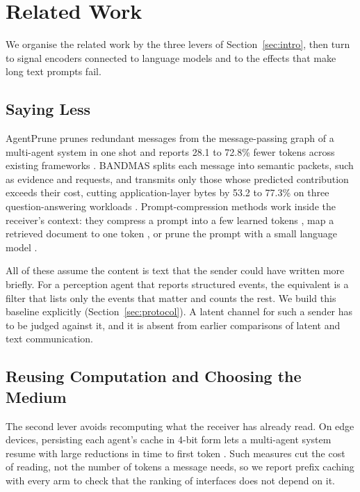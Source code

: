 \section{Related Work}
\label{sec:related}

We organise the related work by the three levers of Section~\ref{sec:intro}, then turn to signal encoders connected to language models and to the effects that make long text prompts fail.

\subsection{Saying Less}
AgentPrune prunes redundant messages from the message-passing graph of a multi-agent system in one shot and reports 28.1 to 72.8\% fewer tokens across existing frameworks \cite{zhang2024cut}. BANDMAS splits each message into semantic packets, such as evidence and requests, and transmits only those whose predicted contribution exceeds their cost, cutting application-layer bytes by 53.2 to 77.3\% on three question-answering workloads \cite{dong2026bandmas}. Prompt-compression methods work inside the receiver's context: they compress a prompt into a few learned tokens \cite{mu2023gist,ge2024icae}, map a retrieved document to one token \cite{cheng2024xrag}, or prune the prompt with a small language model \cite{jiang2023llmlingua}.

All of these assume the content is text that the sender could have written more briefly. For a perception agent that reports structured events, the equivalent is a filter that lists only the events that matter and counts the rest. We build this baseline explicitly (Section~\ref{sec:protocol}). A latent channel for such a sender has to be judged against it, and it is absent from earlier comparisons of latent and text communication.

\subsection{Reusing Computation and Choosing the Medium}
The second lever avoids recomputing what the receiver has already read. On edge devices, persisting each agent's cache in 4-bit form lets a multi-agent system resume with large reductions in time to first token \cite{shkolnikov2026agentmemory}. Such measures cut the cost of reading, not the number of tokens a message needs, so we report prefix caching with every arm to check that the ranking of interfaces does not depend on it.

